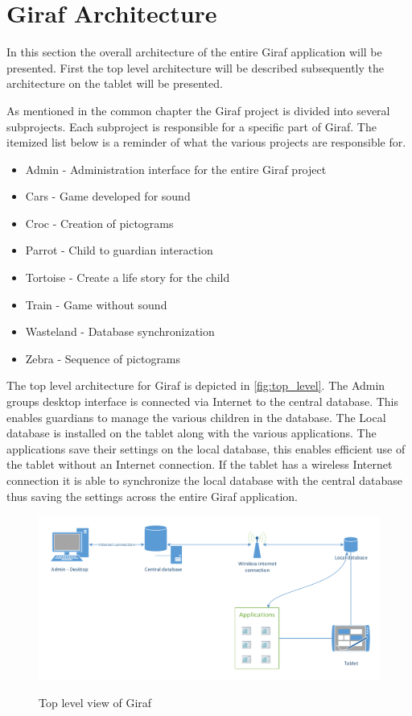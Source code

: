 \section{Giraf Architecture}
In this section the overall architecture of the entire Giraf application will be presented. First the top level architecture will be described subsequently the architecture on the tablet will be presented.

As mentioned in the common chapter  the Giraf project is divided into several subprojects. Each subproject is responsible for a specific part of Giraf. The itemized list below is a reminder of what the various projects are responsible for.

\begin{itemize}
	\item Admin - Administration interface for the entire Giraf project
	\item Cars - Game developed for sound
	\item Croc - Creation of pictograms
	\item Parrot - Child to guardian interaction
	\item Tortoise - Create a life story for the child
	\item Train - Game without sound
	\item Wasteland - Database synchronization
	\item Zebra - Sequence of pictograms
\end{itemize}

The top level architecture for Giraf is depicted in \autoref{fig:top_level}. The Admin groups desktop interface is connected via Internet to the central database. This enables guardians to manage the various children in the database. The Local database is installed on the tablet along with the various applications. The applications save their settings on the local database, this enables efficient use of the tablet without an Internet connection. If the tablet has a wireless Internet connection it is able to synchronize the local database with the central database thus saving the settings across the entire Giraf application. 

\begin{figure}[htpb]
\includegraphics[width=\textwidth]{img/top_level.pdf}
\label{fig:top_level}
\caption{Top level view of Giraf}
\end{figure}

